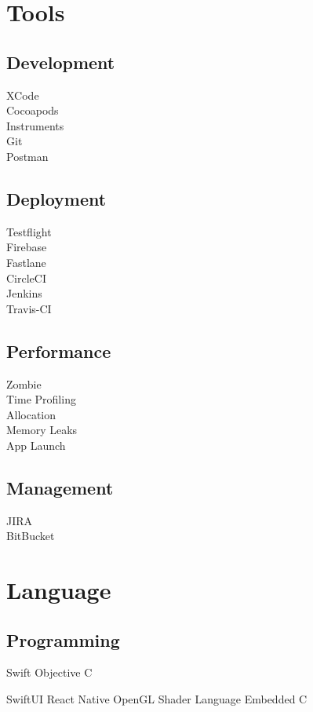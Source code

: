 \documentclass[]{deedy-resume-openfont}
\begin{document}
\begin{minipage}[t]{0.33\textwidth}
\section{Tools}
\subsection{Development}
XCode \\
Cocoapods \\
Instruments \\
Git \\
Postman \\
\sectionsep

\subsection{Deployment}
Testflight \\
Firebase\\
Fastlane\\

CircleCI\\
Jenkins\\
Travis-CI
\sectionsep

\subsection{Performance}
Zombie \\
Time Profiling \\
Allocation \\
Memory Leaks \\
App Launch \\
\sectionsep

\subsection{Management}
JIRA \\
BitBucket\\
\sectionsep



\section{Language}
\subsection{Programming}
Swift \textbullet{}   Objective C 

SwiftUI \textbullet{} React Native \textbullet{} OpenGL \textbullet{} Shader Language \textbullet{} Embedded C
\sectionsep

%
%

\end{minipage} 
\end{document}
